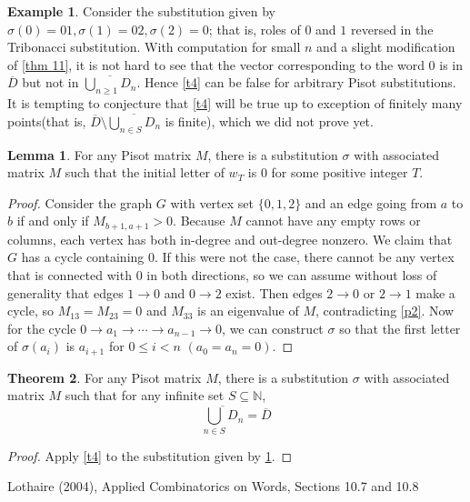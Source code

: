 \documentclass{article}
\theoremstyle{definition}
\newtheorem{theorem}{Theorem}
\newtheorem{lemma}[theorem]{Lemma}
\newtheorem*{example}{Example}
\begin{document}
\begin{example}
Consider the substitution given by $\sigma(0)=01, \sigma(1)=02, \sigma(2)=0$; that is, roles of $0$ and $1$ reversed in the Tribonacci substitution. With computation for small $n$ and a slight modification of \cref{thm 11}, it is not hard to see that the vector corresponding to the word $0$ is in $\overline{D}$ but not in $\overline{\bigcup_{n\geq1}D_n}$. Hence \cref{t4} can be false for arbitrary Pisot substitutions. It is tempting to conjecture that \cref{t4} will be true up to exception of finitely many points(that is, $\overline{D}\setminus\overline{\bigcup_{n\in S}D_n}$ is finite), which we did not prove yet.
\end{example}

\begin{lemma}
\label{l5}
For any Pisot matrix $M$, there is a substitution $\sigma$ with associated matrix $M$ such that the initial letter of $w_T$ is $0$ for some positive integer $T$.
\end{lemma}
\begin{proof}
Consider the graph $G$ with vertex set $\{0,1,2\}$ and an edge going from $a$ to $b$ if and only if $M_{b+1, a+1}>0$. Because $M$ cannot have any empty rows or columns, each vertex has both in-degree and out-degree nonzero. We claim that $G$ has a cycle containing $0$. If this were not the case, there cannot be any vertex that is connected with $0$ in both directions, so we can assume without loss of generality that edges $1\rightarrow0$ and $0\rightarrow 2$ exist. Then edges $2\rightarrow0$ or $2\rightarrow 1$ make a cycle, so $M_{13}=M_{23}=0$ and $M_{33}$ is an eigenvalue of $M$, contradicting \cref{p2}. Now for the cycle $0\rightarrow a_1\rightarrow\cdots\rightarrow a_{n-1}\rightarrow 0$, we can construct $\sigma$ so that the first letter of $\sigma(a_i)$ is $a_{i+1}$ for $0\leq i<n$ $(a_0=a_n=0)$.
\end{proof}

\begin{theorem}
\label{t5}
For any Pisot matrix $M$, there is a substitution $\sigma$ with associated matrix $M$ such that for any infinite set $S\subseteq\mathbb{N}$,
\[
\overline{\bigcup_{n\in S}D_n}=\overline{D}
\]
\end{theorem}
\begin{proof}
Apply \cref{t4} to the substitution given by \cref{l5}.
\end{proof}
\begin{thebibliography}{9}
Lothaire (2004), Applied Combinatorics on Words, Sections 10.7 and 10.8
\end{thebibliography}
\end{document}

